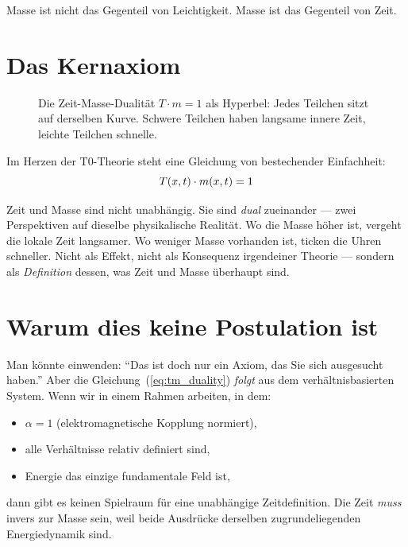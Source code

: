 \epigraph{Masse ist nicht das Gegenteil von Leichtigkeit. Masse ist das Gegenteil von Zeit.}{}

\section{Das Kernaxiom}


\begin{figure}[ht]
\centering
{}
\caption{Die Zeit-Masse-Dualität $T \cdot m = 1$ als Hyperbel: Jedes Teilchen sitzt auf derselben Kurve. Schwere Teilchen haben langsame innere Zeit, leichte Teilchen schnelle.}
\label{fig:tm_duality}
\end{figure}
Im Herzen der T0-Theorie steht eine Gleichung von bestechender Einfachheit:
\begin{equation}
T(x,t) \cdot m(x,t) = 1
\label{eq:tm_duality}
\end{equation}

Zeit und Masse sind nicht unabhängig. Sie sind \emph{dual} zueinander --- zwei Perspektiven auf dieselbe physikalische Realität. Wo die Masse höher ist, vergeht die lokale Zeit langsamer. Wo weniger Masse vorhanden ist, ticken die Uhren schneller. Nicht als Effekt, nicht als Konsequenz irgendeiner Theorie --- sondern als \emph{Definition} dessen, was Zeit und Masse überhaupt sind.

\section{Warum dies keine Postulation ist}

Man könnte einwenden: \enquote{Das ist doch nur ein Axiom, das Sie sich ausgesucht haben.} Aber die Gleichung~(\ref{eq:tm_duality}) \emph{folgt} aus dem verhältnisbasierten System. Wenn wir in einem Rahmen arbeiten, in dem:
\begin{itemize}
\item $\alpha = 1$ (elektromagnetische Kopplung normiert),
\item alle Verhältnisse relativ definiert sind,
\item Energie das einzige fundamentale Feld ist,
\end{itemize}
dann gibt es keinen Spielraum für eine unabhängige Zeitdefinition. Die Zeit \emph{muss} invers zur Masse sein, weil beide Ausdrücke derselben zugrundeliegenden Energiedynamik sind.

